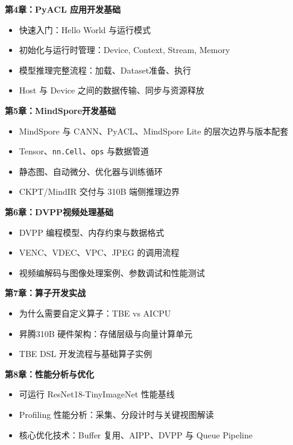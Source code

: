 \textbf{第4章：PyACL 应用开发基础}

\begin{itemize}
\tightlist
\item
  快速入门：Hello World 与运行模式
\item
  初始化与运行时管理：Device, Context, Stream, Memory
\item
  模型推理完整流程：加载、Dataset准备、执行
\item
  Host 与 Device 之间的数据传输、同步与资源释放
\end{itemize}

\textbf{第5章：MindSpore开发基础}

\begin{itemize}
\tightlist
\item
  MindSpore 与 CANN、PyACL、MindSpore Lite 的层次边界与版本配套
\item
  Tensor、\passthrough{\lstinline!nn.Cell!}、\passthrough{\lstinline!ops!}
  与数据管道
\item
  静态图、自动微分、优化器与训练循环
\item
  CKPT/MindIR 交付与 310B 端侧推理边界
\end{itemize}

\textbf{第6章：DVPP视频处理基础}

\begin{itemize}
\tightlist
\item
  DVPP 编程模型、内存约束与数据格式
\item
  VENC、VDEC、VPC、JPEG 的调用流程
\item
  视频编解码与图像处理案例、参数调试和性能测试
\end{itemize}

\textbf{第7章：算子开发实战}

\begin{itemize}
\tightlist
\item
  为什么需要自定义算子：TBE vs AICPU
\item
  昇腾310B 硬件架构：存储层级与向量计算单元
\item
  TBE DSL 开发流程与基础算子实例
\end{itemize}

\textbf{第8章：性能分析与优化}

\begin{itemize}
\tightlist
\item
  可运行 ResNet18-TinyImageNet 性能基线
\item
  Profiling 性能分析：采集、分段计时与关键视图解读
\item
  核心优化技术：Buffer 复用、AIPP、DVPP 与 Queue Pipeline
\end{itemize}

